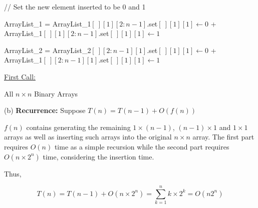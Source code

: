 \documentclass[10pt]{article}
\begin{document}
\begin{algorithm}
{		// Set the new element inserted to be 0 and 1
		
		ArrayList\_1 = ArrayList\_1$[\ ][1][2:n-1]$.set$[\ ][1][1]\gets 0$ + ArrayList\_1$[\ ][1][2:n-1]$.set$[\ ][1][1]\gets 1$
		
		ArrayList\_2 = ArrayList\_2$[\ ][2:n-1][1]$.set$[\ ][1][1]\gets 0$ + ArrayList\_1$[\ ][2:n-1][1]$.set$[\ ][1][1]\gets 1$
		
		
	}

	\underline{First Call:} 

	\caption{All $n\times n$ Binary Arrays}
\end{algorithm}

(b) \textbf{Recurrence:} Suppose $T(n) = T(n-1) + O(f(n))$

$f(n)$ contains generating the remaining $1\times (n-1)$, $(n-1)\times 1$ and $1\times 1$ arrays as well as inserting such arrays into the original $n\times n$ array. The first part requires $O(n)$ time as a simple recursion while the second part requires $O(n\times 2^n)$ time, considering the insertion time.

Thus,

$$
T(n) = T(n-1) + O(n\times 2^n) = \sum_{k=1}^n k\times 2^k = O(n2^n)
$$



\newpage
\end{document}
